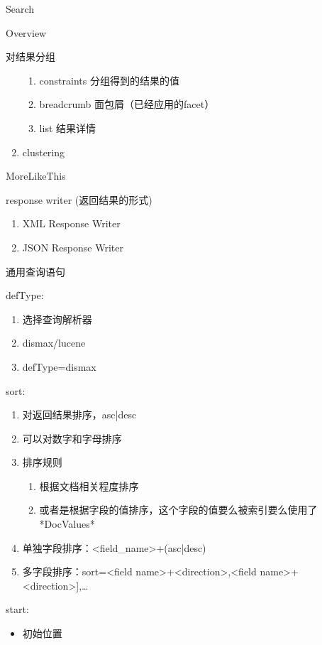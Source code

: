 \documentclass[presentation]{beamer}
\begin{document}
\begin{frame}[fragile,label={sec:org1ccf379}]{Search}
\begin{block}{Overview}
\begin{block}{对结果分组}
\begin{enumerate}
\begin{enumerate}
\item constraints 分组得到的结果的值
\item breadcrumb 面包屑（已经应用的facet）
\item list 结果详情
\end{enumerate}
\item clustering
\end{enumerate}
\end{block}
\begin{block}{MoreLikeThis}
\end{block}
\begin{block}{response writer (返回结果的形式)}
\begin{enumerate}
\item XML Response Writer
\item JSON Response Writer
\end{enumerate}
\end{block}
\end{block}


\begin{block}{通用查询语句}
\begin{block}{defType:}
\begin{enumerate}
\item 选择查询解析器
\item dismax/lucene
\item defType=dismax
\end{enumerate}
\end{block}

\begin{block}{sort:}
\begin{enumerate}
\item 对返回结果排序，asc|desc
\item 可以对数字和字母排序
\item 排序规则
\begin{enumerate}
\item 根据文档相关程度排序
\item 或者是根据字段的值排序，这个字段的值要么被索引要么使用了*DocValues*
\end{enumerate}
\item 单独字段排序：<field\_name>+(asc|desc)
\item 多字段排序：sort=<field name>+<direction>,<field name>+<direction>],\ldots{}
\end{enumerate}
\end{block}

\begin{block}{start:}
\begin{itemize}
\item 初始位置
\end{itemize}
\end{block}


\end{block}
\end{frame}
\end{document}
